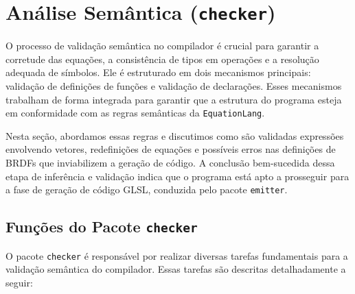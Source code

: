 \section{Análise Semântica (\texttt{checker})} \label{section-checker}
O processo de validação semântica no compilador é crucial para garantir a corretude das equações, a consistência de tipos em operações e a resolução adequada de símbolos. Ele é estruturado em dois mecanismos principais: validação de definições de funções e validação de declarações. Esses mecanismos trabalham de forma integrada para garantir que a estrutura do programa esteja em conformidade com as regras semânticas da \texttt{EquationLang}.

Nesta seção, abordamos essas regras e discutimos como são validadas expressões envolvendo vetores, redefinições de equações e possíveis erros nas definições de BRDFs que inviabilizem a geração de código. A conclusão bem-sucedida dessa etapa de inferência e validação indica que o programa está apto a prosseguir para a fase de geração de código GLSL, conduzida pelo pacote \texttt{emitter}.


\subsection{Funções do Pacote \texttt{checker}}

O pacote \texttt{checker} é responsável por realizar diversas tarefas fundamentais para a validação semântica do compilador. Essas tarefas são descritas detalhadamente a seguir:

